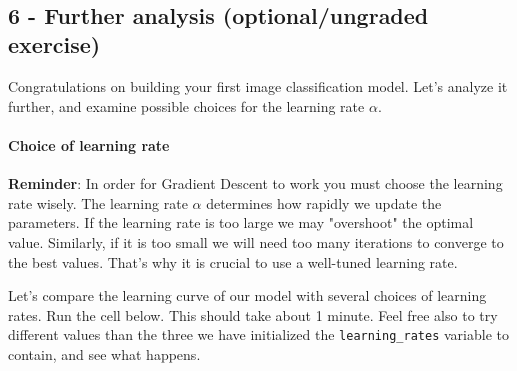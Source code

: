 \documentclass[11pt]{article}
\begin{document}
    \begin{center}
    \end{center}
    { \hspace*{\fill} \\}
    
    \subsection{6 - Further analysis (optional/ungraded
exercise)}\label{further-analysis-optionalungraded-exercise}

Congratulations on building your first image classification model. Let's
analyze it further, and examine possible choices for the learning rate
\(\alpha\).

    \paragraph{Choice of learning rate}\label{choice-of-learning-rate}

\textbf{Reminder}: In order for Gradient Descent to work you must choose
the learning rate wisely. The learning rate \(\alpha\) determines how
rapidly we update the parameters. If the learning rate is too large we
may "overshoot" the optimal value. Similarly, if it is too small we will
need too many iterations to converge to the best values. That's why it
is crucial to use a well-tuned learning rate.

Let's compare the learning curve of our model with several choices of
learning rates. Run the cell below. This should take about 1 minute.
Feel free also to try different values than the three we have
initialized the \texttt{learning\_rates} variable to contain, and see
what happens.


    
    
    
    
\end{document}
